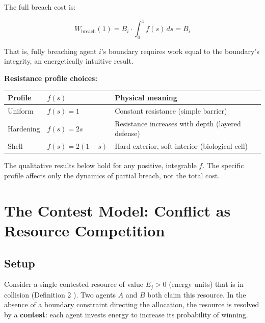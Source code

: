 \documentclass[11pt]{article}
\theoremstyle{plain}
\theoremstyle{definition}
\theoremstyle{remark}
\newcounter{none}
\let\origsection\section
\renewcommand{\section}{\needspace{12\baselineskip}\origsection}
\let\origsubsection\subsection
\renewcommand{\subsection}{\needspace{7\baselineskip}\origsubsection}
\begin{document}
The full breach cost is:

\[W_{\text{breach}}(1) = B_i \cdot \int_0^1 f(s) \, ds = B_i\]

That is, fully breaching agent \(i\)'s boundary requires work equal to
the boundary's integrity, an energetically intuitive result.

\textbf{Resistance profile choices:}

{\def\LTcaptype{none} %
\begin{longtable}[]{@{}
  >{\raggedright\arraybackslash}p{}
  >{\raggedright\arraybackslash}p{}
  >{\raggedright\arraybackslash}p{}@{}}
\toprule\noalign{}
\begin{minipage}[b]{\linewidth}\raggedright
Profile
\end{minipage} & \begin{minipage}[b]{\linewidth}\raggedright
\(f(s)\)
\end{minipage} & \begin{minipage}[b]{\linewidth}\raggedright
Physical meaning
\end{minipage} \\
\midrule\noalign{}
\endhead
\bottomrule\noalign{}
\endlastfoot
Uniform & \(f(s) = 1\) & Constant resistance (simple barrier) \\
Hardening & \(f(s) = 2s\) & Resistance increases with depth (layered
defense) \\
Shell & \(f(s) = 2(1 - s)\) & Hard exterior, soft interior (biological
cell) \\
\end{longtable}
}

The qualitative results below hold for any positive, integrable \(f\).
The specific profile affects only the dynamics of partial breach, not
the total cost.

\section{The Contest Model: Conflict as Resource
Competition}\label{the-contest-model-conflict-as-resource-competition}

\subsection{Setup}\label{setup}

Consider a single contested resource of value \(E_j > 0\) (energy units)
that is in collision (Definition 2 \citep{TC-I}). Two agents \(A\) and
\(B\) both claim this resource. In the absence of a boundary constraint
directing the allocation, the resource is resolved by a
\textbf{contest}: each agent invests energy to increase its probability
of winning.
\end{document}
